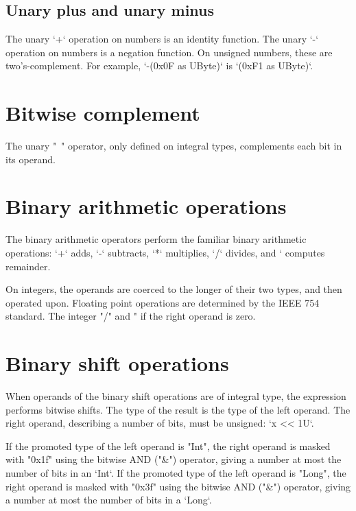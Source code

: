 \subsection{Unary plus and unary minus}

The unary \xcd`+` operation on numbers is an identity function.
The unary \xcd`-` operation on numbers is a negation function.
On unsigned numbers, these are two's-complement.  For example, 
\xcd`-(0x0F as UByte)` is 
\xcd`(0xF1 as UByte)`.



\section{Bitwise complement}

The unary \xcd"~" operator, only defined on integral types, complements each
bit in its operand.  

\section{Binary arithmetic operations} 

The binary arithmetic operators perform the familiar binary arithmetic
operations: \xcd`+` adds, \xcd`-` subtracts, \xcd`*` multiplies, 
\xcd`/` divides, and \xcd`%
computes remainder.

On integers, the operands are coerced to the longer of their two types, and
then operated upon.  
Floating point operations are determined by the IEEE 754
standard. 
The integer \xcd"/" and \xcd"%
if the right operand is zero.



\section{Binary shift operations}

When operands of the binary shift operations are of integral type, the
expression performs bitwise shifts. 
The type of the result is the type of the left operand.
The right operand, describing a number of bits, must be unsigned: 
\xcd`x << 1U`.  


If the promoted type of the left operand is \xcd"Int",
the right operand is masked with \xcd"0x1f" using the bitwise
AND (\xcd"&") operator, giving a number at most the number of bits in an
\xcd`Int`. 
If the promoted type of the left operand is \xcd"Long",
the right operand is masked with \xcd"0x3f" using the bitwise
AND (\xcd"&") operator, giving a number at most the number of bits in a
\xcd`Long`. 

